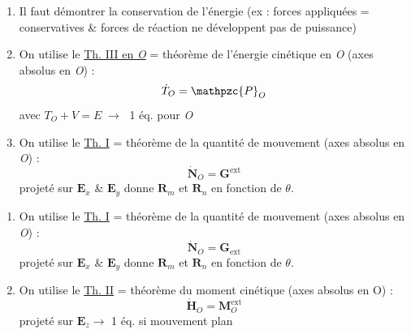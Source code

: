 \documentclass[a4paper]{article}
\begin{document}
\begin{tcolorbox}[title=\textcolor{black}{A. Méthode n°1 - Conservation de l'énergie}, colback=white, colframe=sprinen, sharp corners]
\begin{enumerate}
\item Il faut démontrer la conservation de l'énergie (ex : forces appliquées = conservatives \& forces de réaction ne développent pas de puissance)
\item On utilise le \underline{Th. III en \emph{O}} = théorème de l'énergie cinétique en \emph{O} (axes absolus en \emph{O}) : 
\[ \dot{T}_O = \mathpzc{P}_O \]
avec $ T_O + V = E \; \longrightarrow \; $ 1 éq. pour \emph{O}
\item On utilise le \underline{Th. I} = théorème de la quantité de mouvement (axes absolus en \emph{O}) : 
\[ \dot{\textbf{N}}_O = \textbf{G}^{\text{ext}} \]
projeté sur $ \textbf{E}_x $ \& $ \textbf{E}_y $ donne $ \textbf{R}_m $ et $ \textbf{R}_n $ en fonction de $ \theta $.
\end{enumerate}
\end{tcolorbox}





\begin{tcolorbox}[title=B. Méthode n°2 - Fonctionne dans tous les cas, colback=white, colframe=violet!80, sharp corners]
\begin{enumerate}
\item On utilise le \underline{Th. I} = théorème de la quantité de mouvement (axes absolus en \emph{O}) : 
\[ \dot{\textbf{N}}_O = \textbf{G}_{\text{ext}} \]
projeté sur $ \textbf{E}_x $ \& $ \textbf{E}_y $ donne $ \textbf{R}_m $ et $ \textbf{R}_n $ en fonction de $ \theta $.
\item On utilise le \underline{Th. II} = théorème du moment cinétique (axes absolus en O) : 
\[ \dot{\textbf{H}}_O = \textbf{M}_O^{\text{ext}} \]
projeté sur $ \textbf{E}_z \longrightarrow $ 1 éq. si mouvement plan
\end{enumerate}
\end{tcolorbox}
\end{document}
